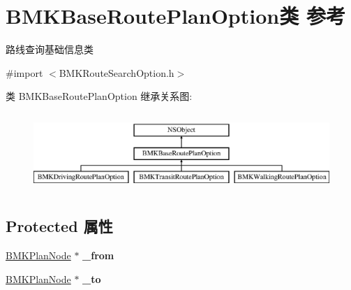 \hypertarget{interface_b_m_k_base_route_plan_option}{}\section{B\+M\+K\+Base\+Route\+Plan\+Option类 参考}
\label{interface_b_m_k_base_route_plan_option}


路线查询基础信息类  




{\ttfamily \#import $<$B\+M\+K\+Route\+Search\+Option.\+h$>$}

类 B\+M\+K\+Base\+Route\+Plan\+Option 继承关系图\+:\begin{figure}[H]
\begin{center}
\leavevmode
\includegraphics[height=3.000000cm]{interface_b_m_k_base_route_plan_option}
\end{center}
\end{figure}
\subsection*{Protected 属性}
\begin{DoxyCompactItemize}
\item 
\hypertarget{interface_b_m_k_base_route_plan_option_a1a668d22cbdfdf6f4b619522a5c24482}{}\hyperlink{interface_b_m_k_plan_node}{B\+M\+K\+Plan\+Node} $\ast$ {\bfseries \+\_\+from}\label{interface_b_m_k_base_route_plan_option_a1a668d22cbdfdf6f4b619522a5c24482}

\item 
\hypertarget{interface_b_m_k_base_route_plan_option_a57edc8a986cecead42fef9e55949157c}{}\hyperlink{interface_b_m_k_plan_node}{B\+M\+K\+Plan\+Node} $\ast$ {\bfseries \+\_\+to}\label{interface_b_m_k_base_route_plan_option_a57edc8a986cecead42fef9e55949157c}

\end{DoxyCompactItemize}

